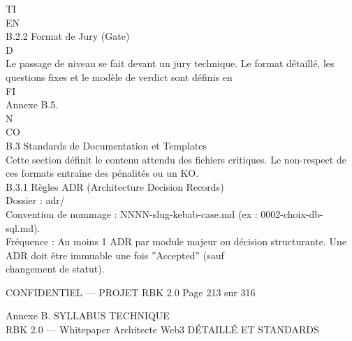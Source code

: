 \vspace{0.5em}
\vspace{0.5em}
\vspace{0.5em}
TI\\
EN\\
B.2.2 Format de Jury (Gate)\\
\vspace{0.5em}
\vspace{0.5em}
\vspace{0.5em}
\vspace{0.5em}
D\\
Le passage de niveau se fait devant un jury technique. Le format détaillé, les questions fixes et le modèle de verdict sont définis en\\
\vspace{0.5em}
\vspace{0.5em}
\vspace{0.5em}
\vspace{0.5em}
FI\\
Annexe B.5.\\
\vspace{0.5em}
\vspace{0.5em}
N\\
CO\\
B.3 Standards de Documentation et Templates\\
Cette section définit le contenu attendu des fichiers critiques. Le non-respect de ces formats entraîne des pénalités ou un KO.\\
\vspace{0.5em}
\vspace{0.5em}
B.3.1 Règles ADR (Architecture Decision Records)\\
Dossier : adr/\\
Convention de nommage : NNNN-slug-kebab-case.md (ex : 0002-choix-db-sql.md).\\
Fréquence : Au moins 1 ADR par module majeur ou décision structurante. Une ADR doit être immuable une fois ”Accepted” (sauf\\
changement de statut).\\
\vspace{0.5em}
\vspace{0.5em}
\vspace{0.5em}
\begin{confidential}CONFIDENTIEL — PROJET RBK 2.0                                 Page 213 sur 316\end{confidential}
Annexe B. SYLLABUS TECHNIQUE\\
RBK 2.0 — Whitepaper Architecte Web3                                                                              DÉTAILLÉ ET STANDARDS\\
